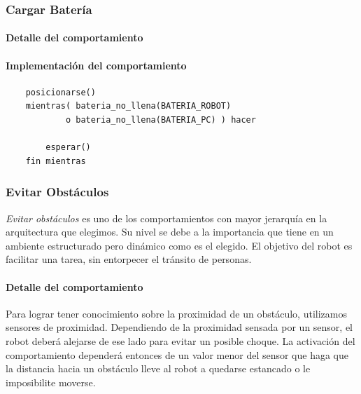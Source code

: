 \subsubsection{Cargar Bater\'ia}
\label{recharge_battery}
\paragraph{Detalle del comportamiento}
\paragraph{Implementaci\'on del comportamiento}
\begin{verbatim}
    posicionarse()
    mientras( bateria_no_llena(BATERIA_ROBOT)
            o bateria_no_llena(BATERIA_PC) ) hacer

        esperar()
    fin mientras
\end{verbatim}

\subsubsection{Evitar Obst\'aculos}
\label{avoid_obstacles}
\emph{Evitar obst\'aculos} es uno de los comportamientos con mayor jerarqu\'ia
en la arquitectura que elegimos. Su nivel se debe a la importancia que tiene
en un ambiente estructurado pero din\'amico como es el elegido. El objetivo
del robot es facilitar una tarea, sin entorpecer el tr\'ansito de personas.
\\
\paragraph{Detalle del comportamiento}
Para lograr tener conocimiento sobre la proximidad de un obst\'aculo, utilizamos
sensores de proximidad. %
Dependiendo de la proximidad sensada por un sensor, el robot deber\'a alejarse
de ese lado para evitar un posible choque. La activaci\'on del comportamiento
depender\'a entonces de un valor menor del sensor que haga que la distancia hacia
un obst\'aculo lleve al robot a quedarse estancado o le imposibilite moverse.
